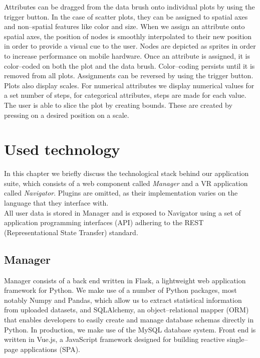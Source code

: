 \documentclass{article}
\begin{document}
\newpage

Attributes can be dragged from the data brush onto individual plots by using the trigger button. In the case of scatter plots, they can be assigned to spatial axes and non--spatial features like color and size. When we assign an attribute onto spatial axes, the position of nodes is smoothly interpolated to their new position in order to provide a visual cue to the user. Nodes are depicted as sprites in order to increase performance on mobile hardware. Once an attribute is assigned, it is color--coded on both the plot and the data brush. Color--coding persists until it is removed from all plots. Assignments can be reversed by using the trigger button.\\

Plots also display scales. For numerical attributes we display numerical values for a set number of steps, for categorical attributes, steps are made for each value. The user is able to slice the plot by creating bounds. These are created by pressing on a desired position on a scale.

\section{Used technology}

In this chapter we briefly discuss the technological stack behind our application suite, which consists of a web component called \emph{Manager} and a VR application called \emph{Navigator}. Plugins are omitted, as their implementation varies on the language that they interface with.\\

All user data is stored in Manager and is exposed to Navigator using a set of application programming interfaces (API) adhering to the REST (Representational State Transfer) standard.\cite{fielding}

\subsection{Manager}

Manager consists of a back end written in Flask, a lightweight web application framework for Python.\cite{flask} We make use of a number of Python packages, most notably Numpy\cite{numpy} and Pandas\cite{pandas}, which allow us to extract statistical information from uploaded datasets, and SQLAlchemy, an object--relational mapper (ORM) that enables developers to easily create and manage database schemas directly in Python.\cite{sqlalchemy} In production, we make use of the MySQL database system.\cite{mysql} Front end is written in Vue.js, a JavaScript framework designed for building reactive single--page applications (SPA).\cite{vuejs}
\end{document}
